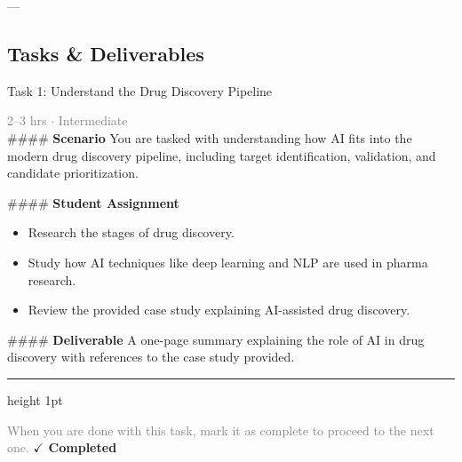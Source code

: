 \documentclass[10pt,a4paper]{article}
\begin{document}
---

\subsection*{Tasks \& Deliverables}

\begin{taskbox}{Task 1: Understand the Drug Discovery Pipeline}

    {\small \textcolor{gray}{2--3 hrs $\cdot$ Intermediate}}\\[12pt]

    \#\#\#\# \textbf{Scenario}
You are tasked with understanding how AI fits into the modern drug discovery pipeline, including target identification, validation, and candidate prioritization.

\#\#\#\# \textbf{Student Assignment}
\begin{itemize}
    \item Research the stages of drug discovery.
    \item Study how AI techniques like deep learning and NLP are used in pharma research.
    \item Review the provided case study explaining AI-assisted drug discovery.
\end{itemize}

\#\#\#\# \textbf{Deliverable}
A one-page summary explaining the role of AI in drug discovery with references to the case study provided.\par

    \vspace{16pt}

    \textcolor{cardBorder}{\hrule height 1pt}\vspace{8pt}

    \small \textcolor{gray}{When you are done with this task, mark it as complete to proceed to the next one.} \hfill \textbf{\textcolor{brandDark}{$\checkmark$ Completed}}

\end{taskbox}
\end{document}

